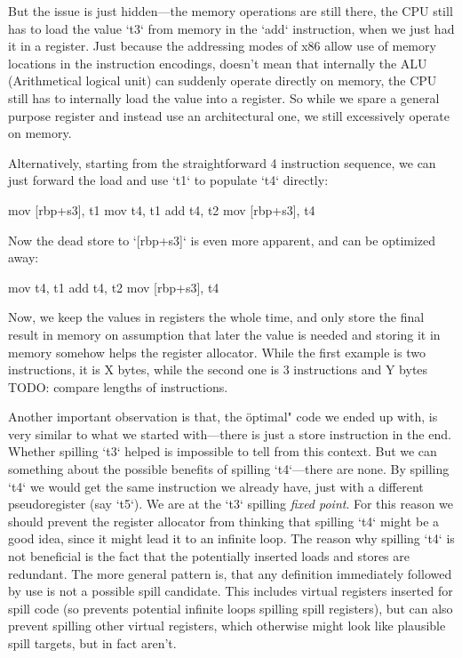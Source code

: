 But the issue is just hidden---the memory operations are still
there, the CPU still has to load the value `t3` from memory in the `add`
instruction, when we just had it in a register. Just because the addressing
modes of x86 allow use of memory locations in the instruction encodings, doesn't
mean that internally the ALU (Arithmetical logical unit) can suddenly operate
directly on memory, the CPU still has to internally load the value into a
register. So while we spare a general purpose register and instead use an
architectural one, we still excessively operate on memory.

Alternatively, starting from the straightforward 4 instruction sequence, we can
just forward the load and use `t1` to populate `t4` directly:

\begtt
mov [rbp+s3], t1
mov t4, t1
add t4, t2
mov [rbp+s3], t4
\endtt

Now the dead store to `[rbp+s3]` is even more apparent, and can be optimized
away:

\begtt
mov t4, t1
add t4, t2
mov [rbp+s3], t4
\endtt

Now, we keep the values in registers the whole time, and only store the final
result in memory on assumption that later the value is needed and storing it in
memory somehow helps the register allocator. While the first example is two
instructions, it is X bytes, while the second one is 3 instructions and Y bytes
TODO: compare lengths of instructions.

Another important observation is that, the \"optimal" code we ended up with, is
very similar to what we started with---there is just a store instruction in the
end. Whether spilling `t3` helped is impossible to tell from this context. But
we can something about the possible benefits of spilling `t4`---there are none.
By spilling `t4` we would get the same instruction we already have, just with a
different pseudoregister (say `t5`). We are at the `t3` spilling {\em fixed
point}. For this reason we should prevent the register allocator from thinking
that spilling `t4` might be a good idea, since it might lead it to an infinite
loop. The reason why spilling `t4` is not beneficial is the fact that the potentially
inserted loads and stores are redundant. The more general pattern is, that any
definition immediately followed by use is not a possible spill candidate. This includes
virtual registers inserted for spill code (so prevents potential infinite loops
spilling spill registers), but can also prevent spilling other virtual
registers, which otherwise might look like plausible spill targets, but in fact
aren't.

